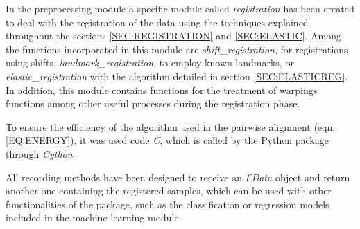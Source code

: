 
In the preprocessing module a specific module called \textit{registration} has
been created to deal with the registration of the data using the techniques
explained throughout the sections \ref{SEC:REGISTRATION} and \ref{SEC:ELASTIC}.
Among the functions incorporated in this module are \textit{shift\_registration},
for registrations using shifts, \textit{landmark\_registration},
to employ known landmarks, or \textit{elastic\_registration} with the algorithm
detailed in section \ref{SEC:ELASTICREG}.
In addition, this module contains functions for the treatment of
warpings functions among other useful processes during the registration phase.

To ensure the efficiency of the algorithm used in the pairwise alignment
(eqn. \ref{EQ:ENERGY}), it was used code \textit{C},
which is called by the Python package through \textit{Cython}.

All recording methods have been designed to receive an \textit{FData} object and
return another one containing the registered samples, which can be used with
other functionalities of the package, such as the classification or regression
models included in the machine learning module.

